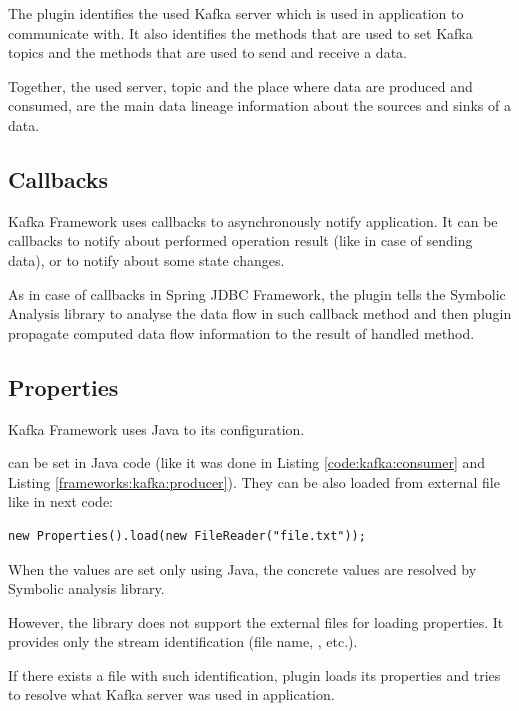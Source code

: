 The plugin identifies the used Kafka server which is used in application to communicate with.
It also identifies the methods that are used to set Kafka topics
and the methods that are used to send and receive a data.

Together, the used server, topic and the place where data are produced and consumed,
are the main data lineage information about the sources and sinks of a data.




\subsection{Callbacks}

Kafka Framework uses callbacks to asynchronously notify application.
It can be callbacks to notify about performed operation result (like in case of sending data),
or to notify about some state changes.

As in case of callbacks in Spring JDBC Framework, the plugin tells
the Symbolic Analysis library to analyse the data flow in such callback method
and then plugin propagate computed data flow information 
to the result of handled method.




\subsection{Properties}

Kafka Framework uses Java  to its configuration.

 can be set in Java code (like it was done in
Listing \ref{code:kafka:consumer} and Listing \ref{frameworks:kafka:producer}).
They can be also loaded from external file like in next code:
\begin{lstlisting}[language=JavaSnippet]
        new Properties().load(new FileReader("file.txt"));
\end{lstlisting}

When the  values are set only using Java, the concrete
values are resolved by Symbolic analysis library.

However, the library does not support the external files for loading properties.
It provides only the stream identification (file name, , etc.).

If there exists a file with such identification, plugin loads its properties and
tries to resolve what Kafka server was used in application.


